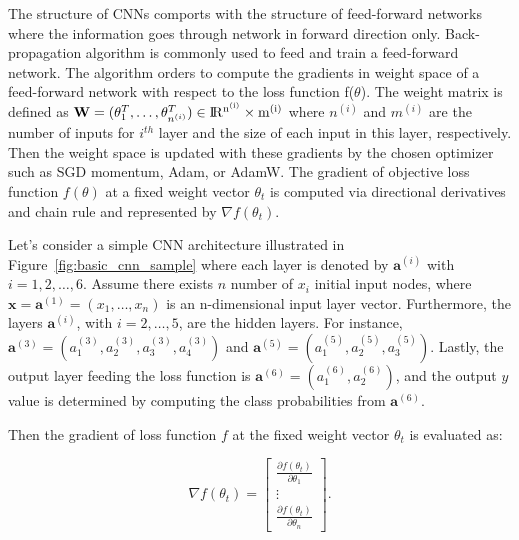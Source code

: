 The structure of CNNs comports with the structure of feed-forward networks where the information goes through network in forward direction only. Back-propagation algorithm is commonly used to feed and train a feed-forward network. The algorithm orders to compute the gradients in weight space of a feed-forward network with respect to the loss function f(\textbf{$\theta$}). The weight matrix is defined as $\textbf{W} =(\theta_{1}^{T}, \dots ,\theta_{n^{(i)}}^{T}) \in \rm I\!R^{n^{(i)}} \times m^{(i)}$ where $n^{(i)}$ and $m^{(i)}$ are the number of inputs for $i^{th}$ layer and the size of each input in this layer, respectively. Then the weight space is updated with these gradients by the chosen optimizer such as SGD momentum, Adam, or AdamW. The gradient of objective loss function $f(\textbf{$\theta$})$ at a fixed weight vector \textbf{$\theta_{t}$} is computed via directional derivatives and chain rule and represented by $\nabla f(\textbf{$\theta_{t}$})$.

Let's consider a simple CNN architecture illustrated in Figure~\ref{fig:basic_cnn_sample} where each layer is denoted by    
$\textbf{a}^{(i)}$ with $i=1,2, \ldots, 6$. Assume there exists $n$ number of $x_{i}$ initial input nodes, where $\textbf{x} = \textbf{a}^{(1)} = (x_{1}, \dots , x_{n})$ is an n-dimensional input layer vector. 
Furthermore, the layers $\textbf{a}^{(i)}$, with $i=2, \ldots, 5$, are the hidden layers. For instance, $\textbf{a}^{(3)} = (a_{1}^{(3)}, a_{2}^{(3)}, a_{3}^{(3)}, a_{4}^{(3)})$ and $\textbf{a}^{(5)} = (a_{1}^{(5)}, a_{2}^{(5)}, a_{3}^{(5)})$. Lastly, the output layer feeding the loss function is $\textbf{a}^{(6)} = (a_{1}^{(6)}, a_{2}^{(6)})$, and the output $y$ value is determined by computing the class probabilities from $\textbf{a}^{(6)}$.

Then the gradient of loss function $f$ at the fixed weight vector $\theta_{t}$ is evaluated as:

\begin{equation}
	\nabla f (\theta_{t}) = 
	\begin{bmatrix}
		\frac { \partial f (\theta_{t})} {\partial \theta_{1}}\\
		\vdots \\
		\frac { \partial f (\theta_{t})} {\partial \theta_{n}}
	\end{bmatrix}.    
\end{equation} 

